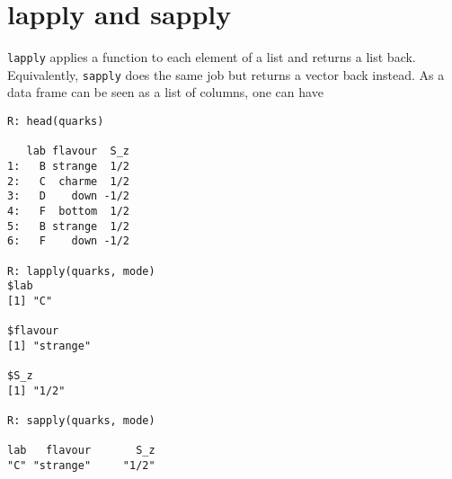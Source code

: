 \section{lapply and sapply}
\texttt{lapply} applies a function to each element of a list
and returns a list back. Equivalently, \texttt{sapply} does
the same job but returns a vector back instead. As a data 
frame can be seen as a list of columns, one can have
\begin{verbatim}
R: head(quarks)

   lab flavour  S_z
1:   B strange  1/2
2:   C  charme  1/2
3:   D    down -1/2
4:   F  bottom  1/2
5:   B strange  1/2
6:   F    down -1/2

R: lapply(quarks, mode)
$lab
[1] "C"

$flavour
[1] "strange"

$S_z
[1] "1/2"

R: sapply(quarks, mode)

lab   flavour       S_z 
"C" "strange"     "1/2"
\end{verbatim}

